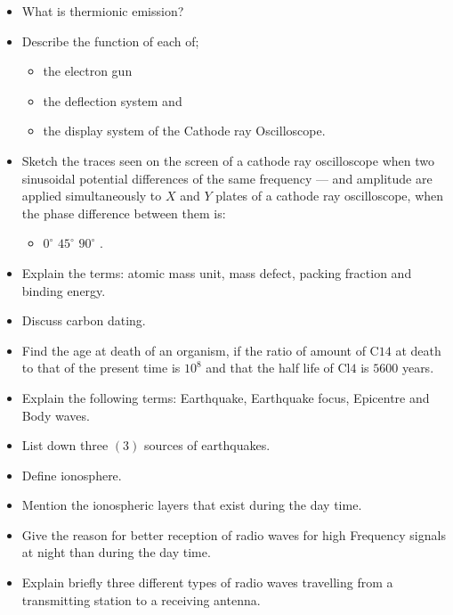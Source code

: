 \documentclass{article}
\begin{document}
\begin{itemize}
\item What is thermionic emission?
\item Describe the function of each of;
 \begin{itemize}
\item the electron gun
\item the deflection system and
\item the display system of the Cathode ray Oscilloscope.
\end{itemize}
\item Sketch the traces seen on the screen of a cathode ray oscilloscope when two sinusoidal potential differences of the same frequency — and amplitude are applied simultaneously to $ X$ and $ Y$ plates of  a cathode ray oscilloscope, when the phase difference between them is:
 \begin{itemize}
\item $ 0^{\circ}$ $ 45^{\circ}$ $ 90^{\circ}$ .
\end{itemize}
\item Explain the terms: atomic mass unit, mass defect, packing fraction and binding energy.
\item Discuss carbon dating.
\item Find the age at death of an organism, if the ratio of amount of C$ 14$ at death to that of the present time is $ 10^{8}$ and that the half life of Cl$ 4$ is $ 5600$ years.
\item Explain the following terms: Earthquake, Earthquake focus, Epicentre and Body waves.
\item List down three $ (3)$ sources of earthquakes.
\item Define ionosphere.
\item Mention the ionospheric layers that exist during the day time.
\item Give the reason for better reception of radio waves for high Frequency signals at night than during the day time.
\item Explain briefly three different types of radio waves travelling from a transmitting station to a receiving antenna.
\end{itemize}
\end{document}
